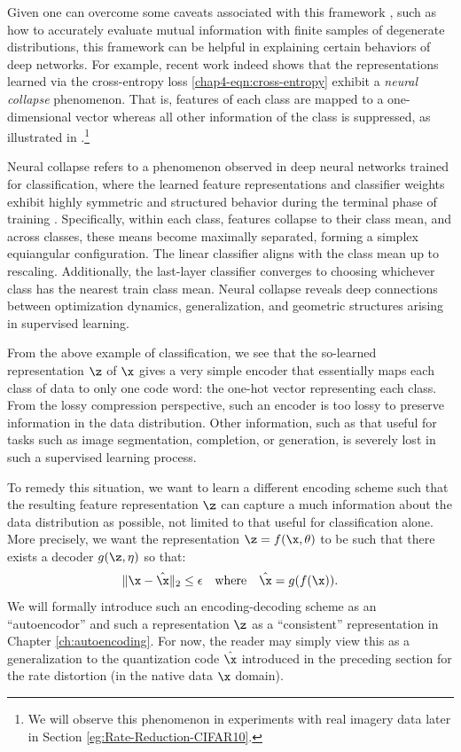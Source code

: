 \documentclass[../../book-main.tex]{subfiles}
\begin{document}
Given one can overcome some caveats associated with this framework \cite{kolchinsky2018caveats-ICLR2018}, such as how to accurately evaluate mutual information with finite samples of degenerate distributions, this framework can be helpful in explaining certain behaviors of deep networks. 
For example, recent work \cite{papyan2020prevalence} indeed shows that the representations learned via the cross-entropy loss \eqref{chap4-eqn:cross-entropy} exhibit a \emph{neural collapse} phenomenon. 
That is, features of each class are mapped to a one-dimensional vector whereas all other information of the class is suppressed, as illustrated in .\footnote{We will observe this phenomenon in experiments with real imagery data later in Section \ref{eg:Rate-Reduction-CIFAR10}.}
\begin{remark}
    Neural collapse refers to a phenomenon observed in deep neural networks trained for classification, where the learned feature representations and classifier weights exhibit highly symmetric and structured behavior during the terminal phase of training \cite{papyan2020prevalence,zhu2021geometric}. Specifically, within each class, features collapse to their class mean, and across classes, these means become maximally separated, forming a simplex equiangular configuration. The linear classifier aligns with the class mean up to rescaling. Additionally, the last-layer classifier converges to choosing whichever class has the nearest train class mean. Neural collapse reveals deep connections between optimization dynamics, generalization, and geometric structures arising in supervised learning. 
    \label{remark:neural-collapse}
\end{remark}

From the above example of classification, we see that the so-learned representation $\z$ of $\x$ gives a very simple encoder that essentially maps each class of data to only one code word: the one-hot vector representing each class. From the lossy compression perspective, such an encoder is too lossy to preserve information in the data distribution. Other information, such as that useful for tasks such as image segmentation, completion, or generation, is severely lost in such a supervised learning process. 

To remedy this situation, we want to learn a different encoding scheme such that the resulting feature representation $\z$ can capture a much information about the data distribution as possible, not limited to that useful for classification alone. More precisely, we want the representation $\z = f(\x, \theta)$ to be such that there exists a decoder $g(\z,\eta)$ so that: 
\begin{equation}
\|\x - \hat \x\|_2 \le \epsilon \quad \mbox{where} \quad \hat{\x} = g(f(\x)).
\end{equation}
We will formally introduce such an encoding-decoding scheme as an ``autoencodor'' and such a representation $\z$ as a ``consistent'' representation  in Chapter \ref{ch:autoencoding}. For now, the reader may simply view this as a generalization to the quantization code $\hat \x$ introduced in the preceding section for the rate distortion (in the native data $\x$ domain).  
\end{document}
